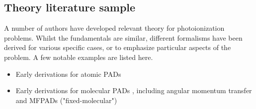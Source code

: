 \subsection{Theory literature sample\label{sec:theory-lit}}

A number of authors have developed relevant theory for photoionization problems. Whilst the fundamentals are similar, different formalisms have been derived for various specific cases, or to emphasize particular aspects of the problem. A few notable examples are listed here.

\begin{itemize}
\item Early derivations for atomic PADs \cite{Cherepkov1979,Cooper1968,Cooper1969,Klar1982}
\item Early derivations for molecular PADs \cite{Buckingham1970,Tully1968}, including angular momentum transfer \cite{Fano1972} and MFPADs ("fixed-molecular") \cite{Dill1976}
\end{itemize}